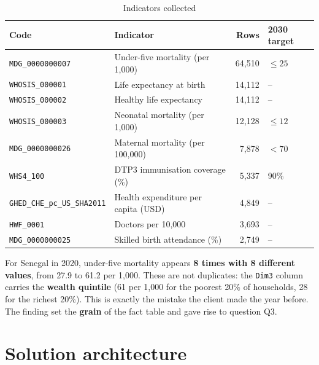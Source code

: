 \documentclass[11pt, a4paper, oneside, headings=normal, numbers=noenddot, DIV=12]{scrartcl}
\begin{document}
\begin{table}[H]
\centering\small
\begin{tabularx}{\linewidth}{@{}l Y r l@{}}
\toprule
\textbf{Code} & \textbf{Indicator} & \textbf{Rows} & \textbf{2030 target} \\
\midrule
\texttt{MDG\_0000000007} & Under-five mortality (per 1,000) & 64,510 & $\leq 25$ \\
\texttt{WHOSIS\_000001} & Life expectancy at birth & 14,112 & – \\
\texttt{WHOSIS\_000002} & Healthy life expectancy & 14,112 & – \\
\texttt{WHOSIS\_000003} & Neonatal mortality (per 1,000) & 12,128 & $\leq 12$ \\
\texttt{MDG\_0000000026} & Maternal mortality (per 100,000) & 7,878 & $< 70$ \\
\texttt{WHS4\_100} & DTP3 immunisation coverage (\%) & 5,337 & 90\% \\
\texttt{GHED\_CHE\_pc\_US\_SHA2011} & Health expenditure per capita (USD) & 4,849 & – \\
\texttt{HWF\_0001} & Doctors per 10,000 & 3,693 & – \\
\texttt{MDG\_0000000025} & Skilled birth attendance (\%) & 2,749 & – \\
\bottomrule
\end{tabularx}
\caption{Indicators collected}
\end{table}

\begin{keybox}
For Senegal in 2020, under-five mortality appears \textbf{8 times with 8 different values}, from 27.9 to 61.2 per 1,000.
These are not duplicates: the \texttt{Dim3} column carries the \textbf{wealth quintile} (61 per 1,000 for the poorest 20\% of households,
28 for the richest 20\%). This is exactly the mistake the client made the year before. The finding set the \textbf{grain} of the fact table
and gave rise to question Q3.
\end{keybox}

\section{Solution architecture}
\end{document}
